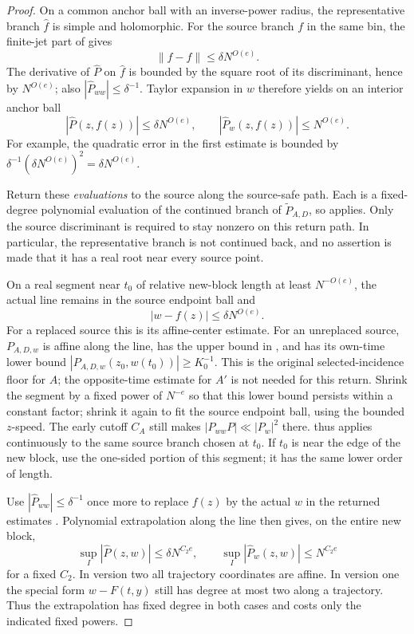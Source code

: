 \begin{proof}
On a common anchor ball with an inverse-power radius,
the representative branch \(\hat f\) is simple and
holomorphic.  For the source branch \(f\) in the same
bin, the finite-jet part of 
gives
\[
 \|f-\hat f\|\le\delta N^{O(e)}.
\]
The derivative of \(\widehat P\) on \(\hat f\) is bounded
by the square root of its discriminant, hence by
\(N^{O(e)}\); also
\(|\widehat P_{ww}|\le\delta^{-1}\).
Taylor expansion in \(w\) therefore yields on an interior
anchor ball
\begin{equation}
 |\widehat P(z,f(z))|\le\delta N^{O(e)},\qquad
 |\widehat P_w(z,f(z))|\le N^{O(e)}.
 \label{a02:anchor-evaluations}
\end{equation}
For example, the quadratic error in the first estimate
is bounded by
\(\delta^{-1}(\delta N^{O(e)})^2
=\delta N^{O(e)}\).

Return these \emph{evaluations} to the source along the
source-safe path.  Each is a fixed-degree polynomial
evaluation of the continued branch of \(\widetilde P_{A,D}\), so
 applies.  Only the source
discriminant is required to stay nonzero on this return
path.  In particular, the representative branch is not
continued back, and no assertion is made that it has
a real root near every source point.

On a real segment near \(t_0\) of relative new-block
length at least \(N^{-O(e)}\), the actual line remains in
the source endpoint ball and
\[
 |w-f(z)|\le\delta N^{O(e)}.
\]
For a replaced source this is its affine-center estimate.
For an unreplaced source, \(P_{A,D,w}\) is affine along the
line, has the upper bound in
, and has its own-time
lower bound \(|P_{A,D,w}(z_0,w(t_0))|\ge K_0^{-1}\).
This is the original selected-incidence floor for \(A\);
the opposite-time estimate for \(A'\) is not needed for this return.
Shrink the segment by a fixed power of \(N^{-e}\) so
that this lower bound persists within a constant factor;
shrink it again to fit the source endpoint ball, using
the bounded \(z\)-speed.  The early cutoff \(C_A\)
still makes \(|P_{ww}P|\ll|P_w|^2\) there.
 thus applies
continuously to the same source branch chosen at \(t_0\).
If \(t_0\) is near the edge of the new block, use the
one-sided portion of this segment; it has the same
lower order of length.

Use \(|\widehat P_{ww}|\le\delta^{-1}\) once more to
replace \(f(z)\) by the actual \(w\) in the returned
estimates .  Polynomial
extrapolation along the line then gives, on the entire
new block,
\begin{equation}
 \sup_I|\widehat P(z,w)|\le\delta N^{C_2e},
 \qquad
 \sup_I|\widehat P_w(z,w)|\le N^{C_2e}
 \label{a02:representative-upper}
\end{equation}
for a fixed \(C_2\).  In version two all trajectory
coordinates are affine.  In version one the special
form \(w-F(t,y)\) still has degree at most two along a
trajectory.  Thus the extrapolation has fixed degree
in both cases and costs only the indicated fixed powers.


\end{proof}
